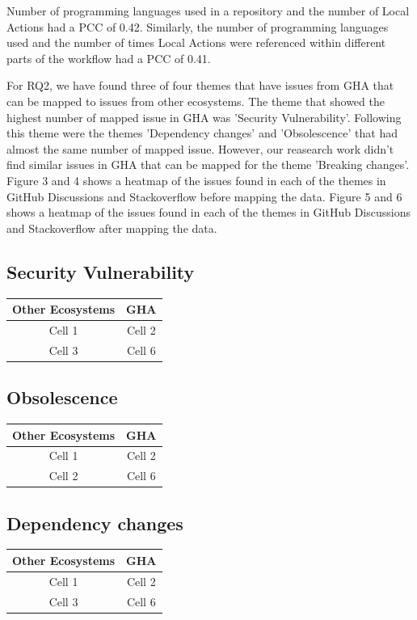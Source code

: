 \documentclass[conference]{IEEEtran}
\begin{document}
    Number of programming languages used in a repository and the number of Local Actions had a PCC of 0.42. Similarly, the number of programming languages used and the number of times Local Actions were referenced within different parts of the workflow had a PCC of 0.41.


For RQ2, we have found three of four themes that have issues from GHA that can be mapped to issues from other ecosystems. The theme that showed the highest number of mapped issue in GHA was 'Security Vulnerability'. Following this theme were the themes 'Dependency changes' and 'Obsolescence'  that had almost the same number of mapped issue. However, our reasearch work didn't find similar issues in GHA that can be mapped for the theme 'Breaking changes'. Figure 3 and 4 shows a heatmap of the issues found in each of the themes in GitHub Discussions and Stackoverflow before mapping the data. Figure 5 and 6 shows a heatmap of the issues found in each of the themes  in GitHub Discussions and Stackoverflow after mapping the data.



\subsection{Security Vulnerability}
\begin{tabular}{|c|c|}
  \hline
  \textbf{Other Ecosystems} & \textbf{GHA} \\
  \hline
  \hline
    Cell 1 & Cell 2  \\
  \hline
    Cell 3 & Cell 6 \\
  \hline
 
\end{tabular}
\subsection{Obsolescence}
\begin{tabular}{|c|c|}
  \hline
  \textbf{Other Ecosystems} & \textbf{GHA} \\
  \hline
  \hline
    Cell 1 & Cell 2  \\
  \hline
    Cell 2 & Cell 6 \\
  \hline

\end{tabular}
\subsection{Dependency changes}
\begin{tabular}{|c|c|}
  \hline
  \textbf{Other Ecosystems} & \textbf{GHA} \\
  \hline
  \hline
    Cell 1 & Cell 2  \\
  \hline
   Cell 3 & Cell 6 \\
  \hline

\end{tabular}
\end{document}
